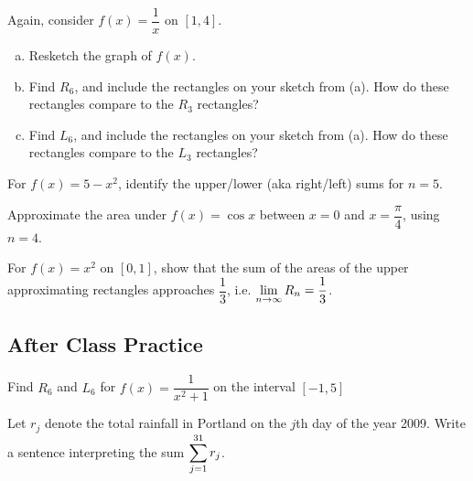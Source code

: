 \documentclass[notes]{subfiles}
\begin{document}
		\begin{ex}
			Again, consider \(f(x) = \dfrac{1}{x}\) on \([1,4]\).
			\begin{enumerate}[(a)]
				\item Resketch the graph of \(f(x)\).
					
				\item Find \(R_6\), and include the rectangles on your sketch from (a).  How do these rectangles compare to the \(R_3\) rectangles?
					
				\item Find \(L_6\), and include the rectangles on your sketch from (a).  How do these rectangles compare to the \(L_3\) rectangles?
 
			\end{enumerate}
		\end{ex}
			\newpage
			
	
		\begin{ex}
			For \(f(x) = 5-x^2\), identify the upper/lower (aka right/left) sums for \(n = 5\).
		\end{ex}
			\vs{1}
			
		\begin{ex}
			Approximate the area under \(f(x) = \cos x\) between \(x=0\) and \(x = \dfrac{\pi}{4}\), using \(n = 4\).
		\end{ex}	
			\vs{1}
			\newpage
			
		\begin{ex}
			For \(f(x) = x^2\) on \([0,1]\), show that the sum of the areas of the upper approximating rectangles approaches \(\dfrac{1}{3}\), i.e. \(\displaystyle \lim_{n\to\infty} R_n = \dfrac{1}{3}\).
		\end{ex}
			\newpage
			
	\subsection*{After Class Practice}
		\begin{ex}
			Find \(R_6\) and \(L_6\) for \(f(x) = \dfrac{1}{x^2+1}\) on the interval \([-1,5]\)
		\end{ex}
			\vs{3}
			
		\begin{ex}
			Let \(r_j\) denote the total rainfall in Portland on the \(j\)th day of the year 2009. Write a sentence interpreting the sum \(\displaystyle \sum_{j=1}^{31} r_j\).
		\end{ex}
\clearpage
\end{document}
